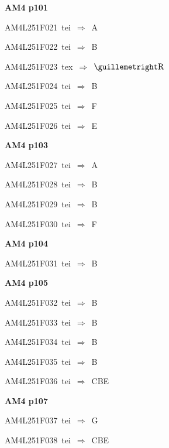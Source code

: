 \par\vfill\eject
{\bf\hfill AM4 p101\hfill\hbox{}}\par\bigskip
{\sixrm AM4L251F021\ {\sixit tei}\ }$\Rightarrow$\ A\par\smallskip
{\sixrm AM4L251F022\ {\sixit tei}\ }$\Rightarrow$\ B\par\smallskip
{\sixrm AM4L251F023\ {\sixit tex}\ }$\Rightarrow$\ $» {\rm R}$\par\smallskip
{\sixrm AM4L251F024\ {\sixit tei}\ }$\Rightarrow$\ B\par\smallskip
{\sixrm AM4L251F025\ {\sixit tei}\ }$\Rightarrow$\ F\par\smallskip
{\sixrm AM4L251F026\ {\sixit tei}\ }$\Rightarrow$\ E\par\smallskip

\par\vfill\eject
{\bf\hfill AM4 p103\hfill\hbox{}}\par\bigskip
{\sixrm AM4L251F027\ {\sixit tei}\ }$\Rightarrow$\ A\par\smallskip
{\sixrm AM4L251F028\ {\sixit tei}\ }$\Rightarrow$\ B\par\smallskip
{\sixrm AM4L251F029\ {\sixit tei}\ }$\Rightarrow$\ B\par\smallskip
{\sixrm AM4L251F030\ {\sixit tei}\ }$\Rightarrow$\ F\par\smallskip

\par\vfill\eject
{\bf\hfill AM4 p104\hfill\hbox{}}\par\bigskip
{\sixrm AM4L251F031\ {\sixit tei}\ }$\Rightarrow$\ {\tenit B}\par\smallskip

\par\vfill\eject
{\bf\hfill AM4 p105\hfill\hbox{}}\par\bigskip
{\sixrm AM4L251F032\ {\sixit tei}\ }$\Rightarrow$\ {\tenit B}\par\smallskip
{\sixrm AM4L251F033\ {\sixit tei}\ }$\Rightarrow$\ {\tenit B}\par\smallskip
{\sixrm AM4L251F034\ {\sixit tei}\ }$\Rightarrow$\ B\par\smallskip
{\sixrm AM4L251F035\ {\sixit tei}\ }$\Rightarrow$\ {\tenit B}\par\smallskip
{\sixrm AM4L251F036\ {\sixit tei}\ }$\Rightarrow$\ CBE\par\smallskip

\par\vfill\eject
{\bf\hfill AM4 p107\hfill\hbox{}}\par\bigskip
{\sixrm AM4L251F037\ {\sixit tei}\ }$\Rightarrow$\ G\par\smallskip
{\sixrm AM4L251F038\ {\sixit tei}\ }$\Rightarrow$\ CBE\par\smallskip

